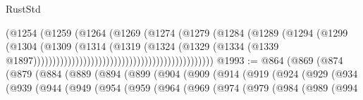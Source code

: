\begin{lexlean}{RustStd}
\begin{coremodule}
{\begin{coremodule}
{{{{{{{{{{{{{{{{{{{{{{{{{{                                                              (@1254
                                                                (@1259
                                                                  (@1264
                                                                    (@1269
                                                                      (@1274
                                                                        (@1279
                                                                          (@1284
                                                                            (@1289
                                                                              (@1294
                                                                                (@1299
                                                                                  (@1304
                                                                                    (@1309
                                                                                      (@1314
                                                                                        (@1319
                                                                                          (@1324
                                                                                            (@1329
                                                                                              (@1334
                                                                                                (@1339
                                                                                                  @1897)))))))))))))))))))))))))))))))))))))))))))))))
@1993 := @864
    (@869
      (@874
        (@879
          (@884
            (@889
              (@894
                (@899
                  (@904
                    (@909
                      (@914
                        (@919
                          (@924
                            (@929
                              (@934
                                (@939
                                  (@944
                                    (@949
                                      (@954
                                        (@959
                                          (@964
                                            (@969
                                              (@974
                                                (@979
                                                  (@984
                                                    (@989
                                                      (@994
}}}}}}}}}}}}}}}}}}}}}}}}}}
\end{coremodule}}
\end{coremodule}
\end{lexlean}
